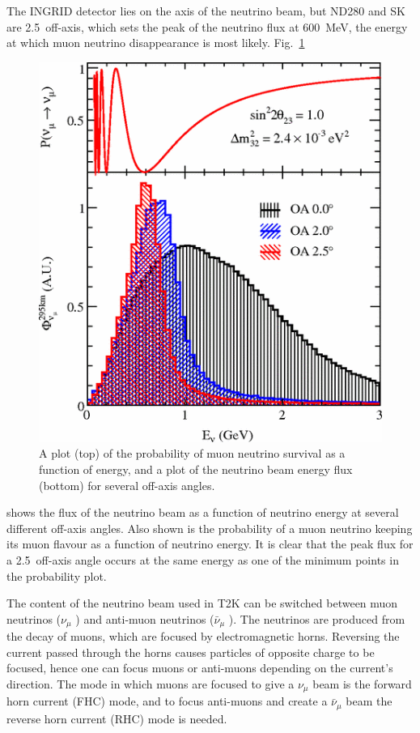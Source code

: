 \documentclass[aps,pra,12pt,notitlepage,tightenlines]{revtex4-1}
\newcommand{\numu}{$\nu_\mu$ }
\newcommand{\anumu}{$\bar\nu_\mu$ }
\begin{document}
The INGRID detector lies on the axis of the neutrino beam, but ND280 and SK are 2.5\degree\ off-axis, which sets the peak of the neutrino flux at 600~MeV, the energy at which muon neutrino disappearance is most likely. Fig.\ \ref{fig:axis} 
\begin{figure}
 \includegraphics[scale=0.5]{axis.png}
 \caption{A plot (top) of the probability of muon neutrino survival as a function of energy, and a plot of the neutrino beam energy flux (bottom) for several off-axis angles.}
 \label{fig:axis}
\end{figure}
shows the flux of the neutrino beam as a function of neutrino energy at several different off-axis angles. Also shown is the probability of a muon neutrino keeping its muon flavour as a function of neutrino energy. It is clear that the peak flux for a 2.5\degree\ off-axis angle occurs at the same energy as one of the minimum points in the probability plot.

The content of the neutrino beam used in T2K can be switched between muon neutrinos (\numu) and anti-muon neutrinos (\anumu). The neutrinos are produced from the decay of muons, which are focused by electromagnetic horns. Reversing the current passed through the horns causes particles of opposite charge to be focused, hence one can focus muons or anti-muons depending on the current's direction. The mode in which muons are focused to give a \numu beam is the forward horn current (FHC) mode, and to focus anti-muons and create a \anumu beam the reverse horn current (RHC) mode is needed.
\end{document}
